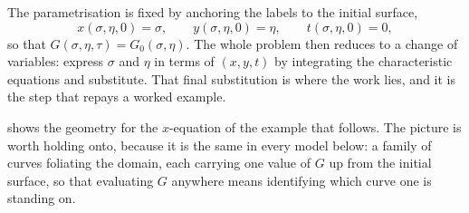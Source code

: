 The parametrisation is fixed by anchoring the labels to the initial surface,
\begin{equation}
\label{m:eq:ICpar}
x(\sigma,\eta,0)=\sigma,
\qquad
y(\sigma,\eta,0)=\eta,
\qquad
t(\sigma,\eta,0)=0 ,
\end{equation}
so that $G(\sigma,\eta,\tau)=G_0(\sigma,\eta)$. The whole problem then reduces to a
change of variables: express $\sigma$ and $\eta$ in terms of $(x,y,t)$ by
integrating the characteristic equations and substitute. That final substitution is
where the work lies, and it is the step that repays a worked example.

 shows the geometry for the $x$-equation of the example
that follows. The picture is worth holding onto, because it is the same in every
model below: a family of curves foliating the domain, each carrying one value of
$G$ up from the initial surface, so that evaluating $G$ anywhere means identifying
which curve one is standing on.

